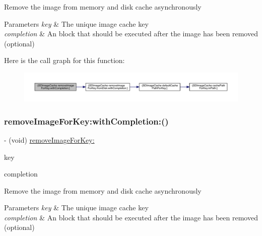 Remove the image from memory and disk cache asynchronously


\begin{DoxyParams}{Parameters}
{\em key} & The unique image cache key \\
\hline
{\em completion} & An block that should be executed after the image has been removed (optional) \\
\hline
\end{DoxyParams}
Here is the call graph for this function\+:\nopagebreak
\begin{figure}[H]
\begin{center}
\leavevmode
\includegraphics[width=350pt]{interface_s_d_image_cache_add965b440292c9da74fc85b395a9812a_cgraph}
\end{center}
\end{figure}
\mbox{\label{interface_s_d_image_cache_add965b440292c9da74fc85b395a9812a}} 
\subsubsection{\texorpdfstring{remove\+Image\+For\+Key\+:with\+Completion\+:()}{removeImageForKey:withCompletion:()}\hspace{0.1cm}{\footnotesize\ttfamily [3/3]}}
{\footnotesize\ttfamily -\/ (void) \mbox{\hyperlink{interface_s_d_image_cache_a1d6ca2afef59216e0cb1740d431833cf}{remove\+Image\+For\+Key\+:}} \begin{DoxyParamCaption}\item[{(N\+S\+String $\ast$)}]{key }\item[{withCompletion:(S\+D\+Web\+Image\+No\+Params\+Block)}]{completion }\end{DoxyParamCaption}}

Remove the image from memory and disk cache asynchronously


\begin{DoxyParams}{Parameters}
{\em key} & The unique image cache key \\
\hline
{\em completion} & An block that should be executed after the image has been removed (optional) \\
\hline
\end{DoxyParams}
\mbox{\label{interface_s_d_image_cache_a3a622a32640d15bf01e873275ea1e95e}} 
